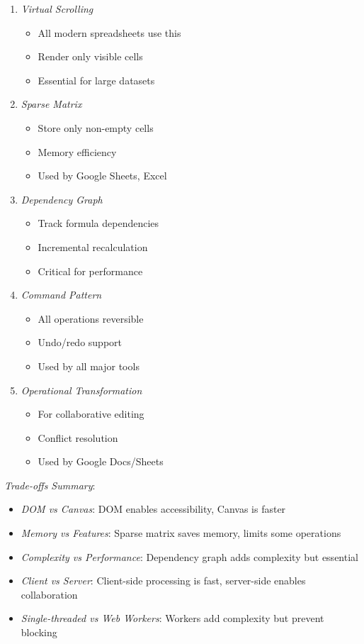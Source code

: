 \documentclass[11pt]{article}
\begin{document}
\begin{enumerate}
\item \emph{Virtual Scrolling}
\begin{itemize}
\item All modern spreadsheets use this
\item Render only visible cells
\item Essential for large datasets
\end{itemize}

\item \emph{Sparse Matrix}
\begin{itemize}
\item Store only non-empty cells
\item Memory efficiency
\item Used by Google Sheets, Excel
\end{itemize}

\item \emph{Dependency Graph}
\begin{itemize}
\item Track formula dependencies
\item Incremental recalculation
\item Critical for performance
\end{itemize}

\item \emph{Command Pattern}
\begin{itemize}
\item All operations reversible
\item Undo/redo support
\item Used by all major tools
\end{itemize}

\item \emph{Operational Transformation}
\begin{itemize}
\item For collaborative editing
\item Conflict resolution
\item Used by Google Docs/Sheets
\end{itemize}
\end{enumerate}

\emph{Trade-offs Summary}:

\begin{itemize}
\item \emph{DOM vs Canvas}: DOM enables accessibility, Canvas is faster
\item \emph{Memory vs Features}: Sparse matrix saves memory, limits some operations
\item \emph{Complexity vs Performance}: Dependency graph adds complexity but essential
\item \emph{Client vs Server}: Client-side processing is fast, server-side enables collaboration
\item \emph{Single-threaded vs Web Workers}: Workers add complexity but prevent blocking
\end{itemize}
\end{document}
